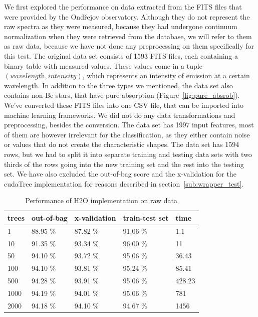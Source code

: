 \documentclass[thesis=B,english]{FITthesis}[2012/10/20]
\begin{document}
We first explored the performance on data extracted from the FITS files that were provided by the Ond{\v r}ejov observatory. Although they do not represent the raw spectra as they were measured, because they had undergone continuum normalization when they were retrieved from the database, we will refer to them as raw data, because we have not done any preprocessing on them specifically for this test. The original data set consists of 1593 FITS files, each containing a binary table with measured values. These values come in a tuple \((\textit{wavelength}, \textit{intensity})\), which represents an intensity of emission at a certain wavelength. In addition to the three types we mentioned, the data set also contains non-Be stars, that have pure absorption (Figure~\ref{fig:pure_absrob}). We've converted these FITS files into one CSV file, that can be imported into machine learning frameworks. We did not do any data transformations and preprocessing, besides the conversion. The data set has 1997 input features, most of them are however irrelevant for the classification, as they either contain noise or values that do not create the characteristic shapes. The data set has 1594 rows, but we had to split it into separate training and testing data sets with two thirds of the rows going into the new training set and the rest into the testing set. We have also excluded the out-of-bag score and the x-validation for the cudaTree implementation for reasons described in section~\ref{sub:wrapper_test}.
\begin{table}[h]
\begin{tabular}{|l|l|l|l|l|}
\hline
trees        & out-of-bag & x-validation & train-test set & time \\ \hline
1            &88.95 \%            &87.82 \%              &91.06 \%                 & 1.1        \\ \hline
10           &91.35 \%            &93.34 \%              &96.00 \%                 & 11       \\ \hline
50           &94.10 \%            &93.72 \%              &95.06 \%                 & 36.43      \\ \hline
100          &94.10 \%            &93.81 \%              &95.24 \%                 & 85.41      \\ \hline
500          &94.28 \%            &93.91 \%              &95.06 \%                 & 428.23     \\ \hline
1000         &94.19 \%            &94.01 \%              &95.06 \%                 & 781        \\ \hline
2000         &94.18 \%            &94.10 \%              &94.67 \%                 & 1456       \\ \hline
\end{tabular}
\caption{Performance of H2O implementation on raw data}
\label{tab:h2o-raw}
\end{table}
\end{document}
